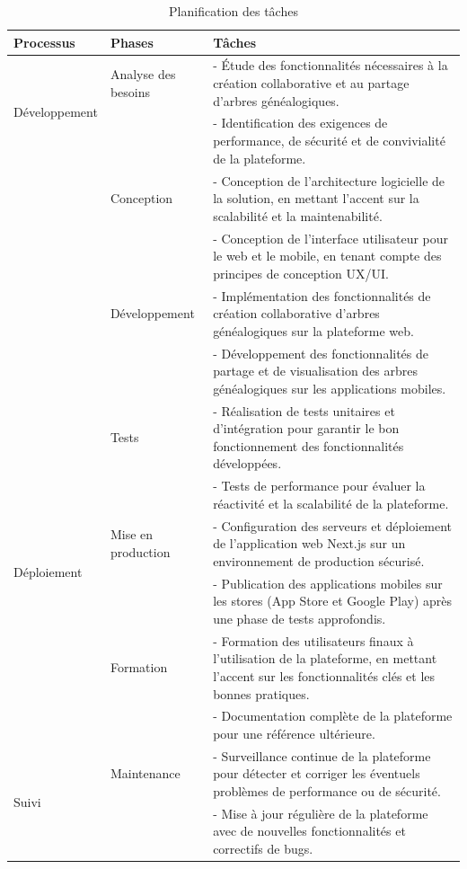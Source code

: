 \begin{table}[htbp]
  \centering
  \begin{tabularx}{\textwidth}{|l|l|X|}
    \hline
    \textbf{Processus} & \textbf{Phases} & \textbf{Tâches} \\ \hline
    \multirow{2}{*}{Développement} & Analyse des besoins & - Étude des fonctionnalités nécessaires à la création collaborative et au partage d'arbres généalogiques. \\
     &  & - Identification des exigences de performance, de sécurité et de convivialité de la plateforme. \\ \cline{2-3}
    & Conception & - Conception de l'architecture logicielle de la solution, en mettant l'accent sur la scalabilité et la maintenabilité. \\
    &  & - Conception de l'interface utilisateur pour le web et le mobile, en tenant compte des principes de conception UX/UI. \\ \cline{2-3}
    & Développement & - Implémentation des fonctionnalités de création collaborative d'arbres généalogiques sur la plateforme web. \\
    &  & - Développement des fonctionnalités de partage et de visualisation des arbres généalogiques sur les applications mobiles. \\ \cline{2-3}
    & Tests & - Réalisation de tests unitaires et d'intégration pour garantir le bon fonctionnement des fonctionnalités développées. \\
    &  & - Tests de performance pour évaluer la réactivité et la scalabilité de la plateforme. \\ \hline
    \multirow{2}{*}{Déploiement} & Mise en production & - Configuration des serveurs et déploiement de l'application web Next.js sur un environnement de production sécurisé. \\
    &  & - Publication des applications mobiles sur les stores (App Store et Google Play) après une phase de tests approfondis. \\ \cline{2-3}
    & Formation & - Formation des utilisateurs finaux à l'utilisation de la plateforme, en mettant l'accent sur les fonctionnalités clés et les bonnes pratiques. \\
    &  & - Documentation complète de la plateforme pour une référence ultérieure. \\ \hline
    \multirow{2}{*}{Suivi} & Maintenance & - Surveillance continue de la plateforme pour détecter et corriger les éventuels problèmes de performance ou de sécurité. \\
    &  & - Mise à jour régulière de la plateforme avec de nouvelles fonctionnalités et correctifs de bugs. \\ \hline
  \end{tabularx}
  \caption{Planification des tâches}
\end{table}


